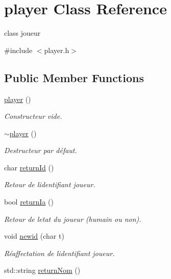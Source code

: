 \hypertarget{classplayer}{}\section{player Class Reference}
\label{classplayer}


class joueur  




{\ttfamily \#include $<$player.\+h$>$}

\subsection*{Public Member Functions}
\begin{DoxyCompactItemize}
\item 
\hyperlink{classplayer_a97de83bce15f880241f561b55b016b02}{player} ()
\begin{DoxyCompactList}\small\item\em Constructeur vide. \end{DoxyCompactList}\item 
\hyperlink{classplayer_aab5d2e47b80e0481f09ca0df8b823057}{$\sim$player} ()
\begin{DoxyCompactList}\small\item\em Destructeur par défaut. \end{DoxyCompactList}\item 
char \hyperlink{classplayer_a6e4d00a9bdc81a1c4bc7cc5aef766510}{return\+Id} ()
\begin{DoxyCompactList}\small\item\em Retour de l\textquotesingle{}identifiant joueur. \end{DoxyCompactList}\item 
bool \hyperlink{classplayer_ac9ddc8bf95e4b1fc87658a3d8426b394}{return\+Ia} ()
\begin{DoxyCompactList}\small\item\em Retour de l\textquotesingle{}etat du joueur (humain ou non). \end{DoxyCompactList}\item 
void \hyperlink{classplayer_ab50915e2d1ce44e19a4a6ac9f34e165c}{newid} (char t)
\begin{DoxyCompactList}\small\item\em Réaffectation de l\textquotesingle{}identifiant joueur. \end{DoxyCompactList}\item 
std\+::string \hyperlink{classplayer_ada00e16c16ff0be00896b1f6df9a21de}{return\+Nom} ()

\end{DoxyCompactItemize}
